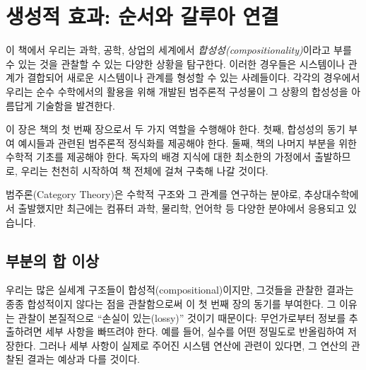 \documentclass[11pt, a4paper, twoside, openany]{book}
\begin{document}
\begin{titlepage}
\end{titlepage}

\tableofcontents
\clearpage

\chapter{생성적 효과: 순서와 갈루아 연결}
\label{ch:1}
\vspace{12pt}

\lettrine[lines=2, loversize=0.15, nindent=0.5em]{\color{ctblue}\textsf{이}}{} 책에서 우리는 과학, 공학, 상업의 세계에서 \textit{합성성(compositionality)}이라고 부를 수 있는 것을 관찰할 수 있는 다양한 상황을 탐구한다. 이러한 경우들은 시스템이나 관계가 결합되어 새로운 시스템이나 관계를 형성할 수 있는 사례들이다. 각각의 경우에서 우리는 순수 수학에서의 활용을 위해 개발된 범주론적 구성물이 그 상황의 합성성을 아름답게 기술함을 발견한다.

이 장은 책의 첫 번째 장으로서 두 가지 역할을 수행해야 한다. 첫째, 합성성의 동기 부여 예시들과 관련된 범주론적 정식화를 제공해야 한다. 둘째, 책의 나머지 부분을 위한 수학적 기초를 제공해야 한다. 독자의 배경 지식에 대한 최소한의 가정에서 출발하므로, 우리는 천천히 시작하여 책 전체에 걸쳐 구축해 나갈 것이다.

\begin{translatornote}
범주론(Category Theory)은 수학적 구조와 그 관계를 연구하는 분야로, 추상대수학에서 출발했지만 최근에는 컴퓨터 과학, 물리학, 언어학 등 다양한 분야에서 응용되고 있습니다.
\end{translatornote}

\section{부분의 합 이상}
\label{sec:1-1}

우리는 많은 실세계 구조들이 합성적(compositional)이지만, 그것들을 관찰한 결과는 종종 합성적이지 않다는 점을 관찰함으로써 이 첫 번째 장의 동기를 부여한다. 그 이유는 관찰이 본질적으로 ``손실이 있는(lossy)'' 것이기 때문이다: 무언가로부터 정보를 추출하려면 세부 사항을 빠뜨려야 한다. 예를 들어, 실수를 어떤 정밀도로 반올림하여 저장한다. 그러나 세부 사항이 실제로 주어진 시스템 연산에 관련이 있다면, 그 연산의 관찰된 결과는 예상과 다를 것이다.
\end{document}
